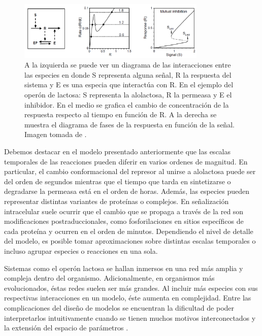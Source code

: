 \begin{figure}
    \centering
    \includegraphics[width=0.8\textwidth]{img/cap_1/switch_example.png}
    \caption{\footnotesize{A la izquierda se puede ver un diagrama de las interacciones entre las especies en donde S representa alguna señal, R la respuesta del sistema y E es una especia que interactúa con R. En el ejemplo del operón de lactosa: S representa la alolactosa, R la permeasa y E el inhibidor. En el medio se grafica el cambio de concentración de la respuesta respecto al tiempo en función de R. A la derecha se muestra el diagrama de fases de la respuesta en función de la señal. Imagen tomada de \cite{Tyson2003}.}}
    \label{fig:switch}
\end{figure}

Debemos destacar en el modelo presentado anteriormente que las escalas temporales de las reacciones pueden diferir en varios ordenes de magnitud. En particular, el cambio conformacional del represor al unirse a alolactosa puede ser del orden de segundos mientras que el tiempo que tarda en sintetizarse o degradarse la permeasa está en el orden de horas. Además, las especies pueden representar distintas variantes de proteínas o complejos. En señalización intracelular suele ocurrir que el cambio que se propaga a través de la red son modificaciones postraduccionales, como fosforilaciones en sitios específicos de cada proteína y ocurren en el orden de minutos. Dependiendo el nivel de detalle del modelo, es posible tomar aproximaciones sobre distintas escalas temporales o incluso agrupar especies o reacciones en una sola.

Sistemas como el operón lactosa se hallan inmersos en una red más amplia y compleja dentro del organismo. Adicionalmente, en organismos más evolucionados, éstas redes suelen ser más grandes. Al incluir más especies con sus respectivas interacciones en un modelo, éste aumenta en complejidad. Entre las complicaciones del diseño de modelos se encuentran la dificultad de poder interpretarlos intuitivamente cuando se tienen muchos motivos interconectados y la extensión del espacio de parámetros \citep{Tyson2020}.

